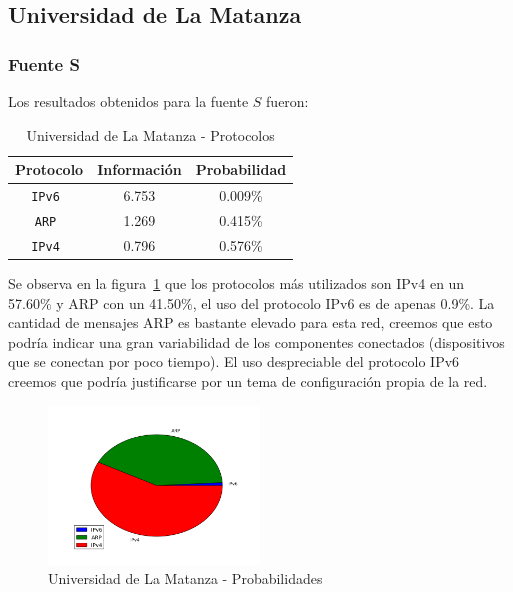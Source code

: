 \documentclass[final,inline,narroweqnarray,a4paper]{ieee}
\begin{document}
\subsection{Universidad de La Matanza}
\subsubsection{Fuente S}

Los resultados obtenidos para la fuente $S$ fueron:

\begin{table}[H]
    \begin{center}
        \begin{tabular}{|c|c|c|}
            \hline
            \textbf{Protocolo} & \textbf{Información} & \textbf{Probabilidad} \\ \hline
            \texttt{IPv6      }& 6.753        & 0.009\%     \\ \hline
            \texttt{ARP       }& 1.269        & 0.415\%     \\ \hline
	    \texttt{IPv4      }& 0.796        & 0.576\%     \\ \hline
        \end{tabular}
        \caption{Universidad de La Matanza - Protocolos}
        \label{table:universidadLMS}
    \end{center}
\end{table} 

Se observa en la figura~\ref{torta:universidadLMS} que los protocolos más utilizados son IPv4 en un 57.60\% y ARP con un 41.50\%, el uso del protocolo IPv6 es de apenas 0.9\%. La cantidad de mensajes ARP es bastante elevado para esta red, creemos que esto podría indicar una gran variabilidad de los componentes conectados (dispositivos que se conectan por poco tiempo). El uso despreciable del protocolo IPv6 creemos que podría justificarse por un tema de configuración propia de la red.


\begin{figure}[H]
    \begin{center}
        \includegraphics[width=0.5\textwidth]{plot/facultadS-pie.png}
        \caption{Universidad de La Matanza - Probabilidades}
        \label{torta:universidadLMS}
    \end{center}
\end{figure}
\end{document}
